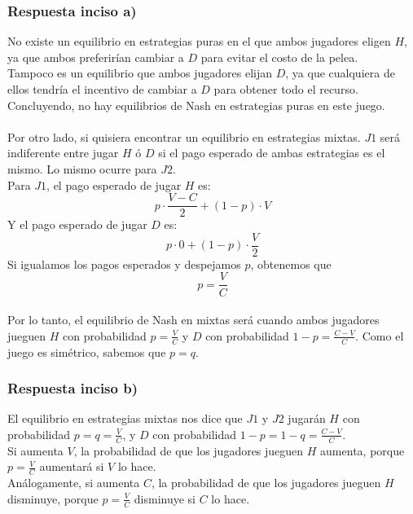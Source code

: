 \documentclass{article}
\begin{document}
        \subsubsection*{Respuesta inciso a)}
            No existe un equilibrio en estrategias puras en el que ambos jugadores eligen $H$, ya que ambos preferirían cambiar a $D$ para evitar el costo de la pelea.
            \\
            Tampoco es un equilibrio que ambos jugadores elijan $D$, ya que cualquiera de ellos tendría el incentivo de cambiar a $D$ para obtener todo el recurso.
            \\
            Concluyendo, no hay equilibrios de Nash en estrategias puras en este juego.
            \\
            \\
            Por otro lado, si quisiera encontrar un equilibrio en estrategias mixtas. $J1$ será indiferente entre jugar $H$ ó $D$ si el pago esperado de ambas estrategias es el mismo. Lo mismo ocurre para $J2$.
            \\
            Para $J1$, el pago esperado de jugar $H$ es:
            \[p \cdot \frac{V - C}{2} + (1 - p) \cdot V\]
            Y el pago esperado de jugar $D$ es:
            \[p \cdot 0 + (1 - p) \cdot \frac{V}{2}\]
            Si igualamos los pagos esperados y despejamos $p$, obtenemos que   
            \[p = \frac{V}{C}\]
            \\
            Por lo tanto, el equilibrio de Nash en mixtas será cuando ambos jugadores jueguen $H$ con probabilidad $p = \frac{V}{C}$ y $D$ con probabilidad $1-p = \frac{C - V}{C}$. Como el juego es simétrico, sabemos que $p = q$.

        \subsubsection*{Respuesta inciso b)}
            El equilibrio en estrategias mixtas nos dice que $J1$ y $J2$ jugarán $H$ con probabilidad $p = q = \frac{V}{C}$, y $D$ con probabilidad $1 - p = 1 - q = \frac{C - V}{C}$.
            \\
            Si aumenta $V$, la probabilidad de que los jugadores jueguen $H$ aumenta, porque $p = \frac{V}{C}$ aumentará si $V$ lo hace.
            \\
            Análogamente, si aumenta $C$, la probabilidad de que los jugadores jueguen $H$ disminuye, porque $p = \frac{V}{C}$ disminuye si $C$ lo hace.
    \newpage
        
\end{document}
